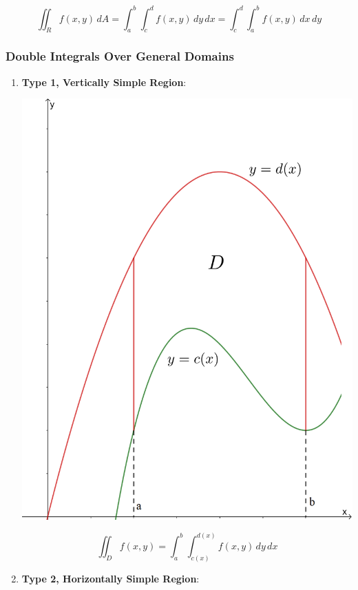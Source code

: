 \documentclass[12pt]{article}
\begin{document}
$$\iint_R f(x,y)\, dA=\int_a^b \int_c^d f(x,y)\, dy\,dx = \int_c^d \int_a^b f(x,y)\, dx\,dy $$
\newpage
\subsubsection{Double Integrals Over General Domains}
\begin{enumerate}
\item \textbf{Type 1, Vertically Simple Region}: 

\includegraphics[scale=0.36]{ysimple.png}

$$\iint_D f(x,y) = \int_a^b \int_{c(x)}^{d(x)} f(x,y)\,dy\,dx$$
\newpage
\item \textbf{Type 2, Horizontally Simple Region}:


\end{enumerate}
\end{document}
